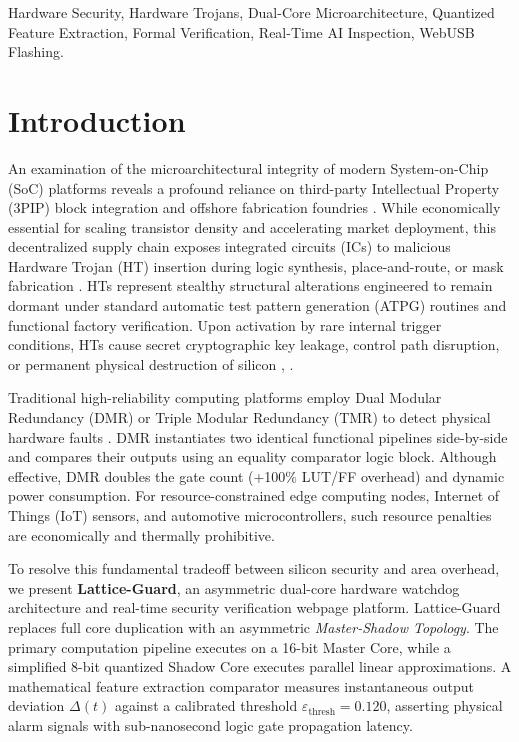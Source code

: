 \documentclass[conference]{IEEEtran}
\begin{document}
\begin{IEEEkeywords}
Hardware Security, Hardware Trojans, Dual-Core Microarchitecture, Quantized Feature Extraction, Formal Verification, Real-Time AI Inspection, WebUSB Flashing.
\end{IEEEkeywords}

\section{Introduction}
An examination of the microarchitectural integrity of modern System-on-Chip (SoC) platforms reveals a profound reliance on third-party Intellectual Property (3PIP) block integration and offshore fabrication foundries \cite{tehranipoor2010survey}. While economically essential for scaling transistor density and accelerating market deployment, this decentralized supply chain exposes integrated circuits (ICs) to malicious Hardware Trojan (HT) insertion during logic synthesis, place-and-route, or mask fabrication \cite{chakraborty2010hardware}. HTs represent stealthy structural alterations engineered to remain dormant under standard automatic test pattern generation (ATPG) routines and functional factory verification. Upon activation by rare internal trigger conditions, HTs cause secret cryptographic key leakage, control path disruption, or permanent physical destruction of silicon \cite{karri2010trustworthy}, \cite{agrawal2007trojan}.

Traditional high-reliability computing platforms employ Dual Modular Redundancy (DMR) or Triple Modular Redundancy (TMR) to detect physical hardware faults \cite{mitra2002which}. DMR instantiates two identical functional pipelines side-by-side and compares their outputs using an equality comparator logic block. Although effective, DMR doubles the gate count (+100\% LUT/FF overhead) and dynamic power consumption. For resource-constrained edge computing nodes, Internet of Things (IoT) sensors, and automotive microcontrollers, such resource penalties are economically and thermally prohibitive.

To resolve this fundamental tradeoff between silicon security and area overhead, we present \textbf{Lattice-Guard}, an asymmetric dual-core hardware watchdog architecture and real-time security verification webpage platform. Lattice-Guard replaces full core duplication with an asymmetric \textit{Master-Shadow Topology}. The primary computation pipeline executes on a 16-bit Master Core, while a simplified 8-bit quantized Shadow Core executes parallel linear approximations. A mathematical feature extraction comparator measures instantaneous output deviation $\Delta(t)$ against a calibrated threshold $\varepsilon_{\text{thresh}} = 0.120$, asserting physical alarm signals with sub-nanosecond logic gate propagation latency.
\end{document}
